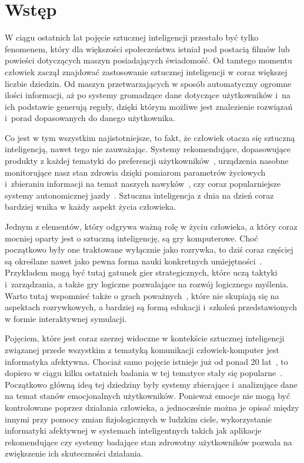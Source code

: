 \chapter{Wstęp}
\label{cha:wstep}
W ciągu ostatnich lat pojęcie sztucznej inteligencji przestało być tylko fenomenem, który dla większości społeczeństwa istniał pod postacią filmów lub powieści dotyczących maszyn posiadających świadomość. Od tamtego momentu człowiek zaczął znajdować zastosowanie sztucznej inteligencji w coraz większej liczbie dziedzin. Od maszyn przetwarzających w sposób automatyczny ogromne ilości informacji, aż po systemy gromadzące dane dotyczące użytkowników i~na ich podstawie generują reguły, dzięki którym możliwe jest znalezienie rozwiązań i~porad dopasowanych do danego użytkownika.

Co jest w tym wszystkim najistotniejsze, to fakt, że człowiek otacza się sztuczną inteligencją, nawet tego nie zauważając. Systemy rekomendujące, dopasowujące produkty z każdej tematyki do preferencji użytkowników~\cite{Gomez-Uribe:2015:NRS:2869770.2843948}, urządzenia nasobne monitorujące nasz stan zdrowia dzięki pomiarom parametrów życiowych i~zbieraniu informacji na temat naszych nawyków~\cite{wearable_computing_amft}, czy coraz popularniejsze systemy autonomicznej jazdy~\cite{dikmen_tesla_autopilot}. Sztuczna inteligencja z dnia na dzień coraz bardziej wnika w każdy aspekt życia człowieka. 

Jednym z elementów, który odgrywa ważną rolę w życiu człowieka, a który coraz mocniej oparty jest o sztuczną inteligencję, są gry komputerowe.  Choć początkowo były one traktowane wyłącznie jako rozrywka, to dziś coraz częściej są określane nawet jako pewna forma nauki konkretnych umiejętności~\cite{oberdorfer_develop_your_strengths_by_gaming}. Przykładem mogą być tutaj gatunek gier strategicznych, które uczą taktyki i~zarządzania, a także gry logiczne pozwalające na rozwój logicznego myślenia. Warto tutaj wspomnieć także o grach poważnych~\cite{serious_games_michael_chen}, które nie skupiają się na aspektach rozrywkowych, a bardziej są formą edukacji i~szkoleń przedstawionych w formie interaktywnej symulacji.

Pojęciem, które jest coraz szerzej widoczne w kontekście sztucznej inteligencji związanej przede wszystkim z tematyką komunikacji człowiek-komputer jest informatyka afektywna. Chociaż samo pojęcie istnieje już od ponad 20 lat~\cite{Picard:1997:AC:265013}, to dopiero w ciągu kilku ostatnich badania w tej tematyce stały się popularne~\cite{gartner_hype_cycles_2018}. Początkowo główną ideą tej dziedziny były systemy zbierające i~analizujące dane na temat stanów emocjonalnych użytkowników. Ponieważ emocje nie mogą być kontrolowane poprzez działania człowieka, a jednocześnie można je opisać między innymi przy pomocy zmian fizjologicznych w ludzkim ciele, wykorzystanie informatyki afektywnej w systemach inteligentnych takich jak aplikacje rekomendujące czy systemy badające stan zdrowotny użytkowników pozwala na zwiększenie ich skuteczności działania.

